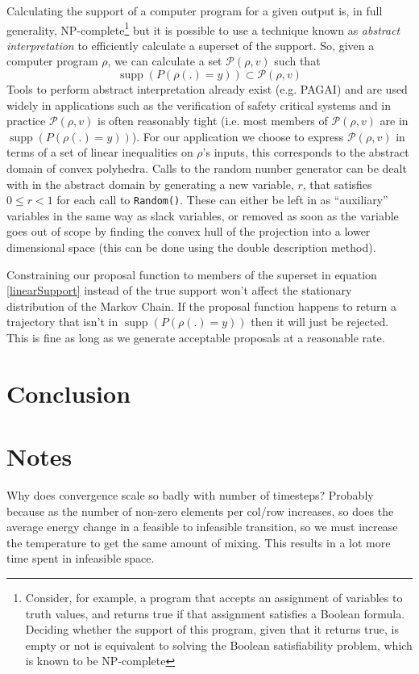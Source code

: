 \documentclass{article}
\DeclareMathOperator\supp{supp}
\begin{document}
Calculating the support of a computer program for a given output is, in full generality, NP-complete\footnote{Consider, for example, a program that accepts an assignment of variables to truth values, and returns true if that assignment satisfies a Boolean formula. Deciding whether the support of this program, given that it returns true, is empty or not is equivalent to solving the Boolean satisfiability problem, which is known to be NP-complete\cite{cook1971complexity}} but it is possible to use a technique known as \textit{abstract interpretation}\cite{cousot1977abstract} to efficiently calculate a superset of the support. So, given a computer program $\rho$, we can calculate a set $\mathcal{P}(\rho, v)$ such that
\[
\supp(P(\rho(.)=y)) \subset \mathcal{P}(\rho, v)
\]
Tools to perform abstract interpretation already exist (e.g. PAGAI\cite{henry2012pagai}) and are used widely in applications such as the verification of safety critical systems\cite{blanchet2003static} and in practice $\mathcal{P}(\rho, v)$ is often reasonably tight (i.e. most members of $\mathcal{P}(\rho, v)$ are in $\supp(P(\rho(.)=y))$). For our application we choose to express $\mathcal{P}(\rho, v)$ in terms of a set of linear inequalities on $\rho$'s inputs, this corresponds to the abstract domain of convex polyhedra\cite{cousot1978automatic}\cite{becchi2018efficient}. Calls to the random number generator can be dealt with in the abstract domain by generating a new variable, $r$, that satisfies $0 \le r < 1$ for each call to \texttt{Random()}. These can either be left in as ``auxiliary'' variables in the same way as slack variables, or removed as soon as the variable goes out of scope by finding the convex hull of the projection into a lower dimensional space (this can be done using the double description method\cite{motzkin1953double}).


Constraining our proposal function to members of the superset in equation \eqref{linearSupport} instead of the true support won't affect the stationary distribution of the Markov Chain. If the proposal function happens to return a trajectory that isn't in $\supp(P(\rho(.)=y))$ then it will just be rejected. This is fine as long as we generate acceptable proposals at a reasonable rate.

\section{Conclusion}

\section{Notes}

Why does convergence scale so badly with number of timesteps? Probably because as the number of non-zero elements per col/row increases, so does the average energy change in a feasible to infeasible transition, so we must increase the temperature to get the same amount of mixing. This results in a lot more time spent in infeasible space. 

%
% 


\end{document}

